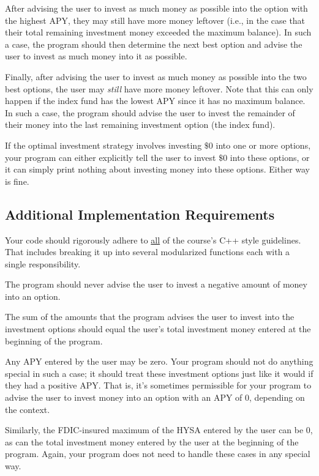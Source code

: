 \documentclass{article}
\begin{document}
After advising the user to invest as much money as possible into the option with the highest APY, they may still have more money leftover (i.e., in the case that their total remaining investment money exceeded the maximum balance). In such a case, the program should then determine the next best option and advise the user to invest as much money into it as possible.

Finally, after advising the user to invest as much money as possible into the two best options, the user may \textit{still} have more money leftover. Note that this can only happen if the index fund has the lowest APY since it has no maximum balance. In such a case, the program should advise the user to invest the remainder of their money into the last remaining investment option (the index fund).

If the optimal investment strategy involves investing $\$0$ into one or more options, your program can either explicitly tell the user to invest $\$0$ into these options, or it can simply print nothing about investing money into these options. Either way is fine.

\subsection{Additional Implementation Requirements}

Your code should rigorously adhere to \ul{all} of the course's C++ style guidelines. That includes breaking it up into several modularized functions each with a single responsibility.

The program should never advise the user to invest a negative amount of money into an option.

The sum of the amounts that the program advises the user to invest into the investment options should equal the user's total investment money entered at the beginning of the program.

Any APY entered by the user may be zero. Your program should not do anything special in such a case; it should treat these investment options just like it would if they had a positive APY. That is, it's sometimes permissible for your program to advise the user to invest money into an option with an APY of 0, depending on the context.

Similarly, the FDIC-insured maximum of the HYSA entered by the user can be 0, as can the total investment money entered by the user at the beginning of the program. Again, your program does not need to handle these cases in any special way.
\end{document}
